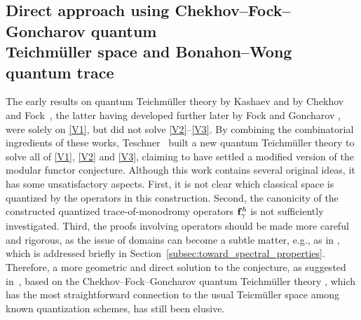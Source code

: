\documentclass[pdftex]{sigma}
\numberwithin{equation}{section}
\theoremstyle{definition}
\begin{document}
\subsection[Direct approach using Chekhov--Fock--Goncharov quantum Teichm\"uller space and Bonahon--Wong quantum trace]{Direct approach using Chekhov--Fock--Goncharov quantum \\ Teichm\"uller space and Bonahon--Wong quantum trace}
The early results on quantum Teichm\"uller theory by Kashaev \cite{Kash98} and by Chekhov and Fock~\cite{CF}, the latter having developed further later by Fock and Goncharov \cite{FG09}, were solely on \ref{V1}, but did not solve \ref{V2}--\ref{V3}. By combining the combinatorial ingredients of these works, Teschner~\cite{T} built a new quantum Teichm\"uller theory to solve all of \ref{V1}, \ref{V2} and \ref{V3}, claiming to have settled a modified version of the modular functor conjecture. Although this work \cite{T} contains several original ideas, it has some unsatisfactory aspects. First, it is not clear which classical space is quantized by the operators in this construction. Second, the canonicity of the constructed quantized trace-of-monodromy operators ${\bf f}^\hbar_\gamma$ is not sufficiently investigated. Third, the proofs involving operators should be made more careful and rigorous, as the issue of domains can become a subtle matter, e.g., as in \cite{Ruijsenaars}, which is addressed briefly in Section~\ref{subsec:toward_spectral_properties}. Therefore, a more geometric and direct solution to the conjecture, as suggested in~\cite{F97, FG09}, based on the Chekhov--Fock--Goncharov quantum Teichm\"uller theory \cite{F97, CF, FG09}, which has the most straightforward connection to the usual Teicm\"uller space among known quantization schemes, has still been elusive.
\end{document}
